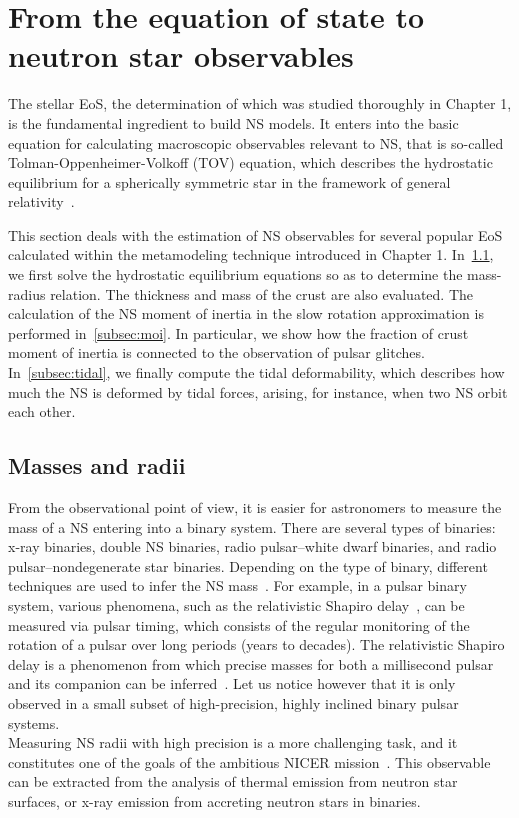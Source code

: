 \minitoc\newpage

\section{From the equation of state to neutron star observables}\label{sec:tov}

The stellar EoS, the determination of which was studied thoroughly in Chapter 
1, is the fundamental ingredient to build NS models. It enters into the 
basic equation for calculating macroscopic observables relevant to NS, that is 
so-called Tolman-Oppenheimer-Volkoff (TOV) equation, which describes the 
hydrostatic equilibrium for a spherically symmetric star in the framework of 
general relativity~\cite{Tolman1939,Oppenheimer1939}.

This section deals with the estimation of NS observables for several 
popular EoS calculated within the metamodeling technique introduced in 
Chapter 1. In~\ref{subsec:masses}, we first solve the hydrostatic 
equilibrium equations so as to determine the mass-radius relation. The 
thickness and mass of the crust are also evaluated. The calculation of the NS 
moment of inertia in the slow rotation approximation is performed 
in~\ref{subsec:moi}. In particular, we show how the fraction of crust moment 
of inertia is connected to the 
observation of pulsar glitches. In~\ref{subsec:tidal}, we finally compute the 
tidal deformability, which describes how much the NS is deformed by tidal 
forces, arising, for instance, when two NS orbit each other.

\subsection{Masses and radii}\label{subsec:masses}

From the observational point of view, it is easier for astronomers to measure 
the mass of a NS entering into a binary system. There are several types of
binaries: x-ray binaries, double NS binaries, radio pulsar--white dwarf 
binaries, and radio pulsar--nondegenerate star binaries. Depending on the type 
of binary, different techniques are used to infer the NS 
mass~\cite{Haensel2007}.
For example, in a pulsar binary system, various phenomena, such as the 
relativistic Shapiro delay~\cite{Shapiro1964}, can be measured via pulsar 
timing, which consists of the regular monitoring of the rotation of a pulsar 
over long periods (years to decades). The relativistic Shapiro delay is a 
phenomenon from which precise masses for both a millisecond pulsar and its 
companion can be inferred~\cite{Demorest2010,Cromartie2020}. Let us notice 
however that it is only observed in a small subset of high-precision, highly 
inclined binary pulsar systems.\\
Measuring NS radii with high precision is a more challenging task, and it
constitutes one of the goals of the ambitious NICER mission~\cite{NICER}. This
observable can be extracted from the analysis of thermal emission from neutron 
star surfaces, or x-ray emission from accreting neutron stars in binaries.


